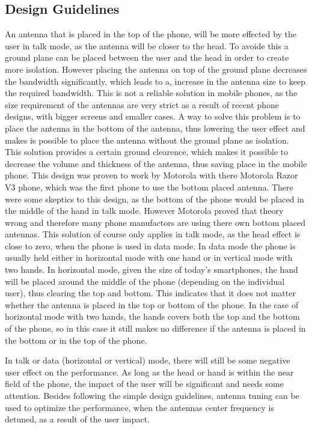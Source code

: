 \subsection{Design Guidelines}
An antenna that is placed in the top of the phone, will be more effected by the user in talk mode, as the antenna will be closer to the head. To avoide this a ground plane can be placed between the user and the head in order to create more isolation. However placing the antenna on top of the ground plane decreases the bandwidth significantly, which leads to a, increase in the antenna size to keep the required bandwidth. This is not a reliable solution in mobile phones, as the size requirement of the antennas are very strict as a result of recent phone designs, with bigger screens and smaller cases. A way to solve this problem is to place the antenna in the bottom of the antenna, thus lowering the user effect and makes is possible to place the antenna without the ground plane as isolation. This solution provides a certain ground clearence, which makes it possible to decrease the volume and thickness of the antenna, thus saving place in the mobile phone. 
This design was proven to work by Motorola with there Motorola Razor V3 phone, which was the first phone to use the bottom placed antenna. There were some skeptics to this design, as the bottom of the phone would be placed in the middle of the hand in talk mode. However Motorola proved that theory wrong and therefore many phone manufactors are using there own bottom placed antennas. This solution of course only applies in talk mode, as the head effect is close to zero, when the phone is used in data mode. In data mode the phone is usually held either in horizontal mode with one hand or in vertical mode with two hands. In horizontal mode, given the size of today's smartphones, the hand will be placed around the middle of the phone (depending on the individual user), thus clearing the top and bottom. This indicates that it does not matter whether the antenna is placed in the top or bottom of the phone. In the case of horizontal mode with two hands, the hands covers both the top and the bottom of the phone, 
so in this case it still makes no difference if the antenna is placed in the bottom or in the top of the phone. 


In talk or data (horizontal or vertical) mode, there will still be some negative user effect on the performance. As long as the head or hand is within the near field of the phone, the impact of the user will be significant and needs some attention. Besides following the simple design guidelines, antenna tuning can be used to optimize the performance, when the antennas center frequency is detuned, as a result of the user impact.

